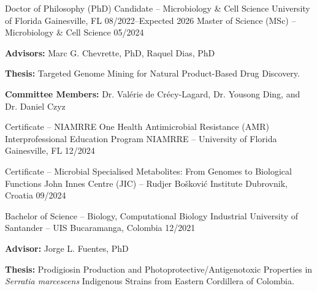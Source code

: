 {}

\begin{cventries}
\cventry
{Doctor of Philosophy (PhD) Candidate -- Microbiology \& Cell Science}
{University of Florida}
{Gainesville, FL}
{08/2022--Expected 2026}
{}
\vspace{-0.4cm}
\cventry
{Master of Science (MSc) -- Microbiology \& Cell Science}
{}
{}
{05/2024}
{
\begin{cvitems}
\item {\textbf{Advisors:} Marc G. Chevrette, PhD, Raquel Dias, PhD}
\item {\textbf{Thesis:} Targeted Genome Mining for Natural Product-Based Drug Discovery.}
\item {\textbf{Committee Members:} Dr. Valérie de Crécy-Lagard, Dr. Yousong Ding, and Dr. Daniel Czyz}
\end{cvitems}
}

\vspace{4mm} 
\cventry
{Certificate -- NIAMRRE One Health Antimicrobial Resistance (AMR) Interprofessional Education Program}
{NIAMRRE -- University of Florida}
{Gainesville, FL}
{12/2024}
{}
\vspace{-4mm}

\cventry
{Certificate -- Microbial Specialised Metabolites: From Genomes to Biological Functions}
{John Innes Centre (JIC) – Rudjer Bošković Institute}
{Dubrovnik, Croatia}
{09/2024}
{}
\vspace{-4mm}

\cventry
{Bachelor of Science -- Biology, Computational Biology}
{Industrial University of Santander -- UIS}
{Bucaramanga, Colombia}
{12/2021} 
{
\begin{cvitems}
\item {\textbf{Advisor:} Jorge L. Fuentes, PhD}
\item {\textbf{Thesis:} Prodigiosin Production and Photoprotective/Antigenotoxic Properties in \textit{Serratia marcescens} Indigenous Strains from Eastern Cordillera of Colombia.}
\end{cvitems}
}
\vspace{-0.2 mm}
    

\end{cventries}

\vspace{3mm}
